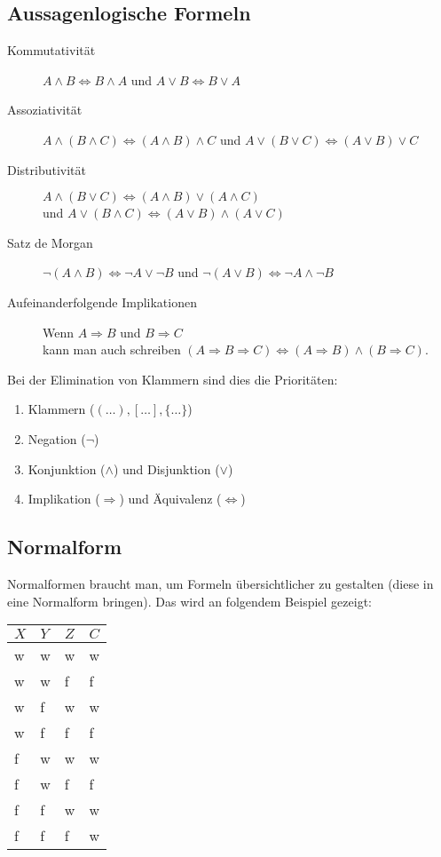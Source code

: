 \subsection{Aussagenlogische Formeln}
\begin{description}
  \item[Kommutativität] $A \wedge B \Leftrightarrow B\wedge A$ und $A \vee B \Leftrightarrow B\vee A$
  \item[Assoziativität] $A \wedge (B \wedge C) \Leftrightarrow (A \wedge B) \wedge C$
    und $A \vee (B \vee C) \Leftrightarrow (A \vee B) \vee C$
  \item[Distributivität] $A \wedge (B \vee C) \Leftrightarrow (A \wedge B) \vee (A \wedge C)$\\
    und $A \vee (B \wedge C) \Leftrightarrow (A \vee B) \wedge (A \vee C)$
  \item[Satz de Morgan] $\neg(A \wedge B) \Leftrightarrow \neg A \vee \neg B$
    und $\neg(A \vee B) \Leftrightarrow \neg A \wedge \neg B$
  \item[Aufeinanderfolgende Implikationen] Wenn $A \Rightarrow B$ und $B \Rightarrow C$ \\ kann man auch schreiben
    $(A \Rightarrow B \Rightarrow C) \Leftrightarrow (A \Rightarrow B) \wedge (B \Rightarrow C)$.
\end{description}
Bei der Elimination von Klammern sind dies die Prioritäten:
\begin{enumerate}
  \item Klammern ($(\dots),[\dots],\{\dots\}$)
  \item Negation ($\neg$)
  \item Konjunktion ($\wedge$) und Disjunktion ($\vee$)
  \item Implikation ($\Rightarrow$) und Äquivalenz ($\Leftrightarrow$)
\end{enumerate}

\subsection{Normalform}
Normalformen braucht man, um Formeln übersichtlicher zu gestalten
(diese in eine Normalform bringen). Das wird an folgendem Beispiel gezeigt:

\begin{tabular}{|l|l|l||l|}
  \hline
  $X$ & $Y$ & $Z$ & $C$ \\
  \hline
  w & w & w & w \\
  w & w & f & f \\
  w & f & w & w \\
  w & f & f & f \\
  f & w & w & w \\
  f & w & f & f \\
  f & f & w & w \\
  f & f & f & w \\
  \hline
\end{tabular}

